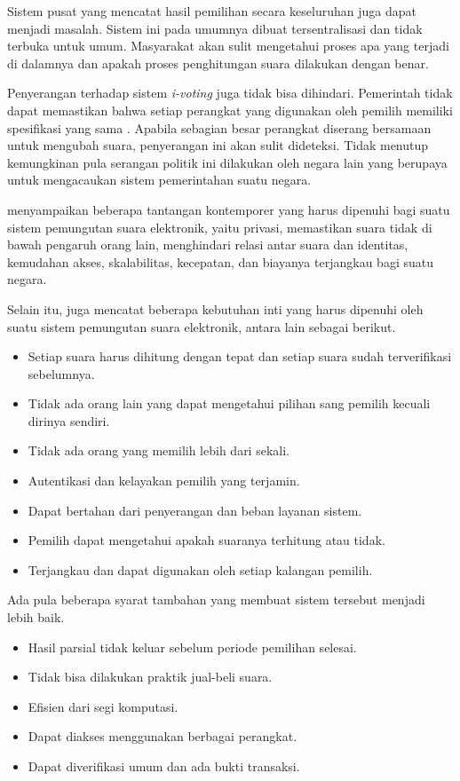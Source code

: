 \documentclass[12pt, a4paper, final]{article}
\begin{document}
Sistem pusat yang mencatat hasil pemilihan secara keseluruhan juga dapat menjadi masalah. Sistem ini pada umumnya dibuat tersentralisasi dan tidak terbuka untuk umum. Masyarakat akan sulit mengetahui proses apa yang terjadi di dalamnya dan apakah proses penghitungan suara dilakukan dengan benar.

Penyerangan terhadap sistem \textit{i-voting} juga tidak bisa dihindari. Pemerintah tidak dapat memastikan bahwa setiap perangkat yang digunakan oleh pemilih memiliki spesifikasi yang sama \citep{mci/Filho2008}. Apabila sebagian besar perangkat diserang bersamaan untuk mengubah suara, penyerangan ini akan sulit dideteksi. Tidak menutup kemungkinan pula serangan politik ini dilakukan oleh negara lain yang berupaya untuk mengacaukan sistem pemerintahan suatu negara.

\cite{comparitiveanalysis} menyampaikan beberapa tantangan kontemporer yang harus dipenuhi bagi suatu sistem pemungutan suara elektronik, yaitu privasi, memastikan suara tidak di bawah pengaruh orang lain, menghindari relasi antar suara dan identitas, kemudahan akses, skalabilitas, kecepatan, dan biayanya terjangkau bagi suatu negara.

Selain itu, \cite{wang2017review} juga mencatat beberapa kebutuhan inti yang harus dipenuhi oleh suatu sistem pemungutan suara elektronik, antara lain sebagai berikut.

\begin{itemize}
    \setlength\itemsep{-0.5em}
    \item Setiap suara harus dihitung dengan tepat dan setiap suara sudah terverifikasi sebelumnya.
    \item Tidak ada orang lain yang dapat mengetahui pilihan sang pemilih kecuali dirinya sendiri.
    \item Tidak ada orang yang memilih lebih dari sekali.
    \item Autentikasi dan kelayakan pemilih yang terjamin.
    \item Dapat bertahan dari penyerangan dan beban layanan sistem.
    \item Pemilih dapat mengetahui apakah suaranya terhitung atau tidak.
    \item Terjangkau dan dapat digunakan oleh setiap kalangan pemilih.
\end{itemize}

Ada pula beberapa syarat tambahan yang membuat sistem tersebut menjadi lebih baik.

\begin{itemize}
    \setlength\itemsep{-0.5em}
    \item Hasil parsial tidak keluar sebelum periode pemilihan selesai.
    \item Tidak bisa dilakukan praktik jual-beli suara.
    \item Efisien dari segi komputasi.
    \item Dapat diakses menggunakan berbagai perangkat.
    \item Dapat diverifikasi umum dan ada bukti transaksi.
\end{itemize}
\end{document}
